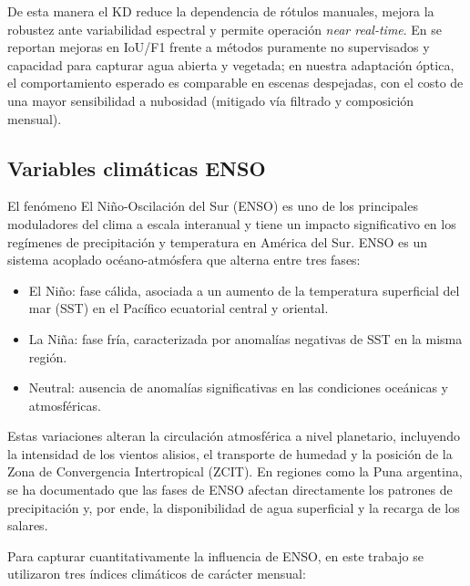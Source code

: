 
De esta manera el KD reduce la dependencia de rótulos manuales, mejora la robustez ante variabilidad espectral y permite operación \emph{near real-time}. En \cite{DeepAqua2023} se reportan mejoras en IoU/F1 frente a métodos puramente no supervisados y capacidad para capturar agua abierta y vegetada; en nuestra adaptación óptica, el comportamiento esperado es comparable en escenas despejadas, con el costo de una mayor sensibilidad a nubosidad (mitigado vía filtrado y composición mensual).



\subsection*{Variables climáticas ENSO}

El fenómeno El Niño-Oscilación del Sur (ENSO) es uno de los principales moduladores del clima a escala interanual y tiene un impacto significativo en los regímenes de precipitación y temperatura en América del Sur. ENSO es un sistema acoplado océano-atmósfera que alterna entre tres fases:

\begin{itemize}
    \item El Niño: fase cálida, asociada a un aumento de la temperatura superficial del mar (SST) en el Pacífico ecuatorial central y oriental.
    \item La Niña: fase fría, caracterizada por anomalías negativas de SST en la misma región.
    \item Neutral: ausencia de anomalías significativas en las condiciones oceánicas y atmosféricas.
\end{itemize}

Estas variaciones alteran la circulación atmosférica a nivel planetario, incluyendo la intensidad de los vientos alisios, el transporte de humedad y la posición de la Zona de Convergencia Intertropical (ZCIT). En regiones como la Puna argentina, se ha documentado que las fases de ENSO afectan directamente los patrones de precipitación y, por ende, la disponibilidad de agua superficial y la recarga de los salares.

Para capturar cuantitativamente la influencia de ENSO, en este trabajo se utilizaron tres índices climáticos de carácter mensual:


